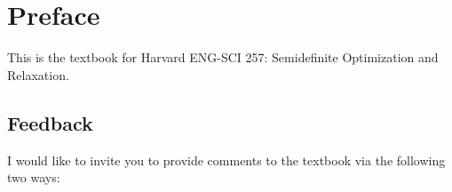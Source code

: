 \documentclass[
]{book}
\theoremstyle{definition}
\theoremstyle{definition}
\theoremstyle{definition}
\theoremstyle{definition}
\theoremstyle{remark}
\begin{document}
\newcommand{\cbrace}[1]{\{ #1 \}}
\newcommand{\lcbrace}[1]{ \left\{ #1 \right\} }
\newcommand{\aff}{\mathrm{aff}}
\newcommand{\bbN}{\mathbb{N}}
\newcommand{\dist}{\mathrm{dist}}
\newcommand{\subject}{\mathrm{s.t.}}
\newcommand{\cl}{\mathrm{cl}}
\newcommand{\eye}{\mathrm{I}}
\newcommand{\inv}{^{-1}}
\newcommand{\invtran}{^{-\top}}
\newcommand{\Range}{\mathrm{Range}}
\renewcommand{\ker}{\mathrm{ker}}
\newcommand{\face}{\mathrm{face}}
\newcommand{\lmid}{\ \middle\vert\ }
\renewcommand{\Re}{\mathrm{Re}}
\newcommand{\hatmap}[1]{[#1]_{\times}}
\newcommand{\kron}{\otimes}
\newcommand{\skron}{\kron_{\mathrm{s}}}
\newcommand{\Ideal}{\mathrm{Ideal}}
\newcommand{\lexsucc}{\succ_{\mathrm{lex}}}
\newcommand{\lexprec}{\prec_{\mathrm{lex}}}
\newcommand{\grlexsucc}{\succ_{\mathrm{grlex}}}
\newcommand{\grlexprec}{\prec_{\mathrm{grlex}}}
\newcommand{\grevlexsucc}{\succ_{\mathrm{grevlex}}}
\newcommand{\grevlexprec}{\prec_{\mathrm{grevlex}}}
\newcommand{\abs}[1]{|#1|}
\newcommand{\initial}[1]{\mathrm{in}(#1)}
\newcommand{\NormalForm}{\mathrm{NormalForm}}
\newcommand{\ceil}[1]{\lceil #1 \rceil}
\newcommand{\floor}[1]{\lfloor #1 \rfloor}

\newcommand{\qmodule}{\mathrm{Qmodule}}
\newcommand{\mom}{\mathrm{mom}}
\newcommand{\loc}{\mathrm{loc}}
\newcommand{\preorder}{\mathrm{Preorder}}
\newcommand{\supp}{\mathrm{supp}}
\newcommand{\New}{\mathrm{New}}
\newcommand{\myspan}{\mathrm{span}}

\chapter*{Preface}\label{preface}

This is the textbook for Harvard ENG-SCI 257: Semidefinite Optimization and Relaxation.

\section*{Feedback}\label{feedback}

I would like to invite you to provide comments to the textbook via the following two ways:
\end{document}
